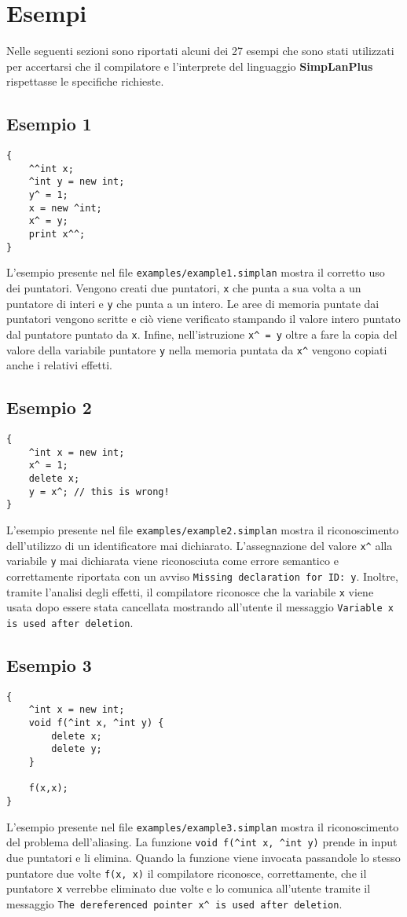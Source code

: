 \documentclass[../report.tex]{subfiles}
\begin{document}
\chapter{Esempi}\label{c:esempi}
Nelle seguenti sezioni sono riportati alcuni dei 27 esempi che sono stati utilizzati per accertarsi che il compilatore e l'interprete del linguaggio \textbf{SimpLanPlus} rispettasse le specifiche richieste.
\section{Esempio 1}\label{s:esempio1}
\begin{lstlisting}
{
    ^^int x;
    ^int y = new int;
    y^ = 1;
    x = new ^int;
    x^ = y;
    print x^^;
}
\end{lstlisting}
L'esempio presente nel file \verb|examples/example1.simplan| mostra il corretto uso dei puntatori.
Vengono creati due puntatori, \verb|x| che punta a sua volta a un puntatore di interi e \verb|y| che punta a un intero.
Le aree di memoria puntate dai puntatori vengono scritte e ciò viene verificato stampando il valore intero puntato dal puntatore puntato da \verb|x|.
Infine, nell'istruzione \verb|x^ = y| oltre a fare la copia del valore della variabile puntatore \verb|y| nella memoria puntata da \verb|x^| vengono copiati anche i relativi effetti.

\section{Esempio 2}\label{s:esempio2}
\begin{lstlisting}
{
    ^int x = new int;
    x^ = 1;
    delete x;
    y = x^; // this is wrong!
}
\end{lstlisting}
L'esempio presente nel file \verb|examples/example2.simplan| mostra il riconoscimento dell'utilizzo di un identificatore mai dichiarato.
L'assegnazione del valore \verb|x^| alla variabile \verb|y| mai dichiarata viene riconosciuta come errore semantico e correttamente riportata con un avviso \verb|Missing declaration for ID: y|.
Inoltre, tramite l'analisi degli effetti, il compilatore riconosce che la variabile \verb|x| viene usata dopo essere stata cancellata mostrando all'utente il messaggio \verb|Variable x is used after deletion|.

\section{Esempio 3}\label{s:esempio3}
\begin{lstlisting}
{
    ^int x = new int;
    void f(^int x, ^int y) {
        delete x;
        delete y;
    }

    f(x,x);
}
\end{lstlisting}
L'esempio presente nel file \verb|examples/example3.simplan| mostra il riconoscimento del problema dell'aliasing.
La funzione \verb|void f(^int x, ^int y)| prende in input due puntatori e li elimina.
Quando la funzione viene invocata passandole lo stesso puntatore due volte \verb|f(x, x)| il compilatore riconosce, correttamente, che il puntatore \verb|x| verrebbe eliminato due volte e lo comunica all'utente tramite il messaggio \verb|The dereferenced pointer x^ is used after deletion|.
\end{document}
